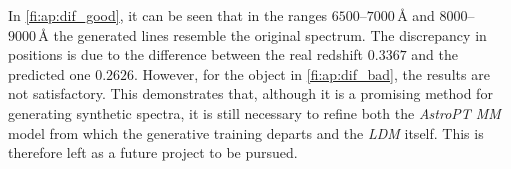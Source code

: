 In \cref{fi:ap:dif_good}, it can be seen that in the ranges $6500$--$7000\,\text{\AA{}}$ and $8000$--$9000\,\text{\AA{}}$ the generated lines resemble the original spectrum. The discrepancy in positions is due to the difference between the real redshift $0.3367$ and the predicted one $0.2626$. However, for the object in \cref{fi:ap:dif_bad}, the results are not satisfactory. This demonstrates that, although it is a promising method for generating synthetic spectra, it is still necessary to refine both the \textit{AstroPT MM} model from which the generative training departs and the \textit{\gls{LDM}} itself. This is therefore left as a future project to be pursued.